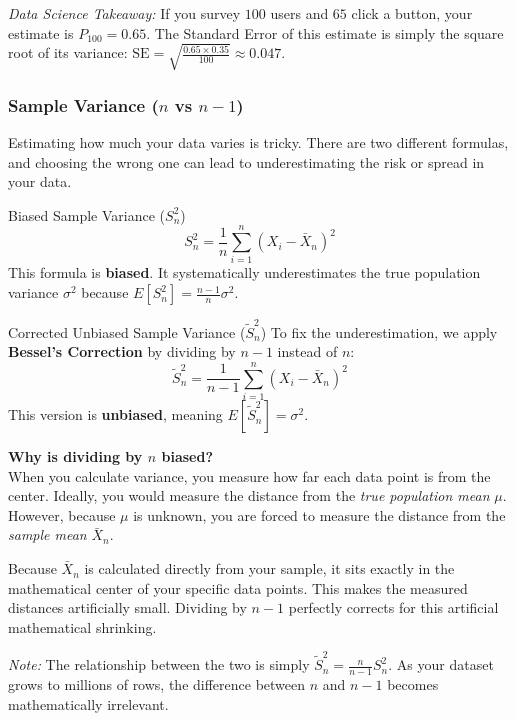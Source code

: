 \documentclass[11pt]{article}
\theoremstyle{smallexample}
\newcommand{\vs}{\vspace{0.2\baselineskip}}
\begin{document}
\textit{Data Science Takeaway:} If you survey $100$ users and $65$ click a button, your estimate is $P_{100} = 0.65$. The Standard Error of this estimate is simply the square root of its variance: $\text{SE} = \sqrt{\frac{0.65 \times 0.35}{100}} \approx 0.047$. 

\subsubsection{Sample Variance ($n$ vs $n-1$)}
Estimating how much your data varies is tricky. There are two different formulas, and choosing the wrong one can lead to underestimating the risk or spread in your data.

\begin{defbox}{Biased Sample Variance ($S_n^2$)}
\begin{equation}
S_n^2 = \frac{1}{n}\sum_{i=1}^{n} (X_i - \bar{X}_n)^2
\end{equation}
This formula is \textbf{biased}. It systematically underestimates the true population variance $\sigma^2$ because $E[S_n^2] = \frac{n-1}{n}\sigma^2$.
\end{defbox}

\begin{defbox}{Corrected Unbiased Sample Variance ($\tilde{S}_n^2$)}
To fix the underestimation, we apply \textbf{Bessel's Correction} by dividing by $n-1$ instead of $n$:
\begin{equation}
\tilde{S}_n^2 = \frac{1}{n-1}\sum_{i=1}^{n} (X_i - \bar{X}_n)^2
\end{equation}
This version is \textbf{unbiased}, meaning $E[\tilde{S}_n^2] = \sigma^2$. 
\end{defbox}

\vs
\textbf{Why is dividing by $n$ biased?} \\
When you calculate variance, you measure how far each data point is from the center. Ideally, you would measure the distance from the \textit{true population mean} $\mu$. However, because $\mu$ is unknown, you are forced to measure the distance from the \textit{sample mean} $\bar{X}_n$. 

Because $\bar{X}_n$ is calculated directly from your sample, it sits exactly in the mathematical center of your specific data points. This makes the measured distances artificially small. Dividing by $n-1$ perfectly corrects for this artificial mathematical shrinking.

\textit{Note:} The relationship between the two is simply $\tilde{S}_n^2 = \frac{n}{n-1} S_n^2$. As your dataset grows to millions of rows, the difference between $n$ and $n-1$ becomes mathematically irrelevant.
\end{document}
